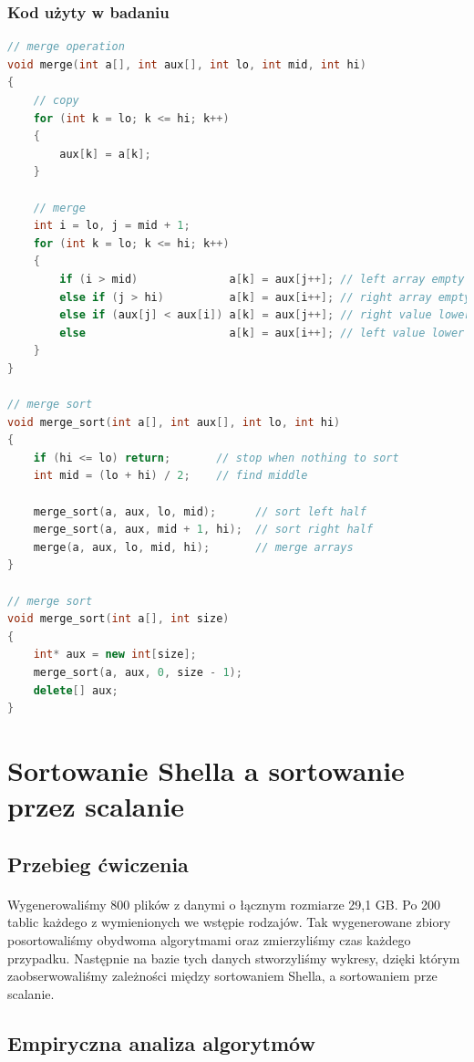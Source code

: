 \documentclass{article}
\begin{document}
\subsubsection{Kod użyty w badaniu}
\begin{lstlisting}[language=C++]
// merge operation
void merge(int a[], int aux[], int lo, int mid, int hi)
{
	// copy
	for (int k = lo; k <= hi; k++)
	{
		aux[k] = a[k];
	}

	// merge
	int i = lo, j = mid + 1;
	for (int k = lo; k <= hi; k++)
	{
		if (i > mid)              a[k] = aux[j++]; // left array empty
		else if (j > hi)          a[k] = aux[i++]; // right array empty
		else if (aux[j] < aux[i]) a[k] = aux[j++]; // right value lower
		else                      a[k] = aux[i++]; // left value lower
	}
}

// merge sort
void merge_sort(int a[], int aux[], int lo, int hi)
{
	if (hi <= lo) return;       // stop when nothing to sort
	int mid = (lo + hi) / 2;    // find middle

	merge_sort(a, aux, lo, mid);      // sort left half  
	merge_sort(a, aux, mid + 1, hi);  // sort right half
	merge(a, aux, lo, mid, hi);       // merge arrays
}

// merge sort
void merge_sort(int a[], int size)
{
	int* aux = new int[size];
	merge_sort(a, aux, 0, size - 1);
	delete[] aux;
}
\end{lstlisting}
\break

\section{Sortowanie Shella a sortowanie przez scalanie}
\subsection{Przebieg ćwiczenia}
\paragraph{} Wygenerowaliśmy 800 plików z danymi o łącznym rozmiarze 29,1 GB. Po 200 tablic każdego z wymienionych we wstępie rodzajów. Tak wygenerowane zbiory posortowaliśmy obydwoma algorytmami oraz zmierzyliśmy czas każdego przypadku. Następnie na bazie tych danych stworzyliśmy wykresy, dzięki którym zaobserwowaliśmy zależności między sortowaniem Shella, a sortowaniem prze scalanie.

\subsection{Empiryczna analiza algorytmów}
\end{document}
